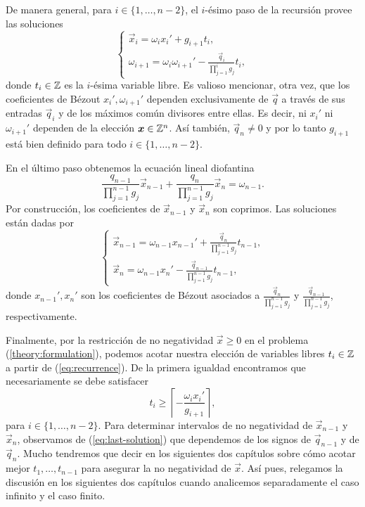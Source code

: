 De manera general, para $i \in \lbrace 1, \ldots, n - 2 \rbrace$, el $i$-ésimo paso de la recursión
provee las soluciones
\begin{equation}
	\label{eq:recurrence}
	\begin{cases}
		\vec{x}_i = \omega_ix_i' + g_{i + 1}t_i, \\
		\omega_{i + 1} = \omega_i\omega_{i + 1}' - \frac{\vec{q}_i}{\prod_{j=1}^{i}g_j}t_i,
	\end{cases}
\end{equation}
donde $t_i \in \mathbb{Z}$ es la $i$-ésima variable libre. Es valioso mencionar, otra vez, que los
coeficientes de Bézout $x_i', \omega_{i+1}'$ dependen exclusivamente de $\vec{q}$ a través de sus
entradas $\vec{q}_i$ y de los máximos común divisores entre ellas. Es decir, ni $x_i'$ ni $\omega_{i
+ 1}'$ dependen de la elección $\boldsymbol{x} \in \mathbb{Z}^n$. Así también, $\vec{q}_n \neq 0$ y por lo tanto
$g_{i + 1}$ está bien definido para todo $i \in \lbrace 1, \ldots, n - 2 \rbrace$.

En el último paso obtenemos la ecuación lineal diofantina
\begin{equation}
	\label{eq:last-equation}
	\frac{q_{n-1}}{\prod_{j=1}^{n-1}g_j}\vec{x}_{n-1} +
	\frac{q_{n}}{\prod_{j=1}^{n-1}g_j}\vec{x}_n
	= \omega_{n-1}.
\end{equation}
Por construcción, los coeficientes de $\vec{x}_{n - 1}$ y $\vec{x}_n$ son coprimos. Las soluciones
están dadas por
\begin{equation}
	\label{eq:last-solution}
	\begin{cases}
		\vec{x}_{n-1} = \omega_{n-1}x_{n-1}' + \frac{\vec{q}_n}{\prod_{j=1}^{n-1}g_j}t_{n-1}, \\
		\vec{x}_n = \omega_{n-1}x_n' - \frac{\vec{q}_{n-1}}{\prod_{j=1}^{n-1}g_j}t_{n-1},
	\end{cases}
\end{equation}
donde $x_{n-1}', x_n'$ son los coeficientes de Bézout asociados a
$\frac{\vec{q}_n}{\prod_{j=1}^{n-1}g_j}$ y $\frac{\vec{q}_{n-1}}{\prod_{j=1}^{n-1}g_j}$,
respectivamente.

Finalmente, por la restricción de no negatividad $\vec{x} \geq 0$ en el problema
(\ref{theory:formulation}), podemos acotar nuestra elección de variables libres $t_i \in \mathbb{Z}$ a
partir de (\ref{eq:recurrence}). De la primera igualdad encontramos que necesariamente se debe
satisfacer
\begin{equation}
	\label{eq:param-lb}
	t_i \geq \left\lceil -\frac{\omega_ix_i'}{g_{i + 1}} \right\rceil,
\end{equation}
para $i \in \lbrace 1, \ldots, n - 2\rbrace$. Para determinar intervalos de no negatividad de
$\vec{x}_{n-1}$ y $\vec{x}_n$, observamos de (\ref{eq:last-solution}) que dependemos de los signos
de $\vec{q}_{n-1}$ y de $\vec{q}_n$. Mucho tendremos que decir en los siguientes dos capítulos sobre
cómo acotar mejor $t_1, \ldots, t_{n-1}$ para asegurar la no negatividad de $\vec{x}$. Así pues,
relegamos la discusión en los siguientes dos capítulos cuando analicemos separadamente el caso
infinito y el caso finito.


